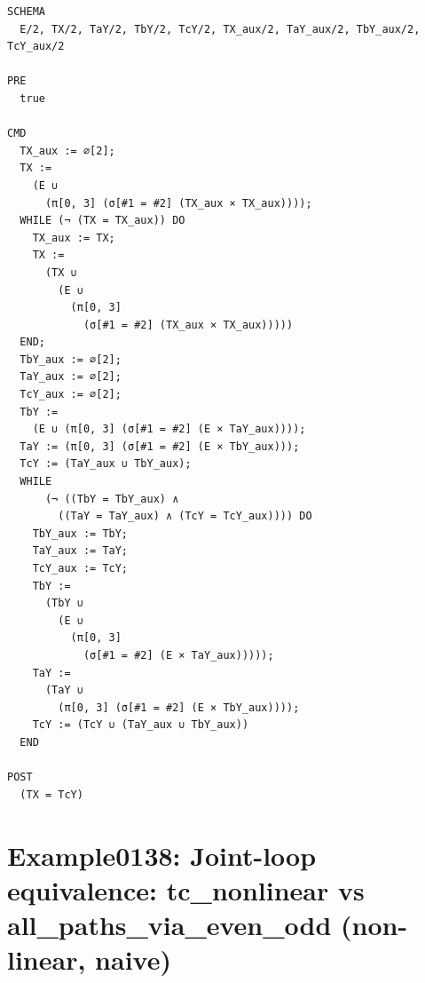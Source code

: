 \documentclass[10pt]{article}
\begin{document}
\begin{Verbatim}[fontsize=\tiny,breaklines=true,breakanywhere=true,frame=single,framesep=1.5mm]
SCHEMA
  E/2, TX/2, TaY/2, TbY/2, TcY/2, TX_aux/2, TaY_aux/2, TbY_aux/2, TcY_aux/2

PRE
  true 

CMD
  TX_aux := ∅[2];
  TX :=
    (E ∪
      (π[0, 3] (σ[#1 = #2] (TX_aux × TX_aux))));
  WHILE (¬ (TX = TX_aux)) DO
    TX_aux := TX;
    TX :=
      (TX ∪
        (E ∪
          (π[0, 3]
            (σ[#1 = #2] (TX_aux × TX_aux)))))
  END;
  TbY_aux := ∅[2];
  TaY_aux := ∅[2];
  TcY_aux := ∅[2];
  TbY :=
    (E ∪ (π[0, 3] (σ[#1 = #2] (E × TaY_aux))));
  TaY := (π[0, 3] (σ[#1 = #2] (E × TbY_aux)));
  TcY := (TaY_aux ∪ TbY_aux);
  WHILE
      (¬ ((TbY = TbY_aux) ∧
        ((TaY = TaY_aux) ∧ (TcY = TcY_aux)))) DO
    TbY_aux := TbY;
    TaY_aux := TaY;
    TcY_aux := TcY;
    TbY :=
      (TbY ∪
        (E ∪
          (π[0, 3]
            (σ[#1 = #2] (E × TaY_aux)))));
    TaY :=
      (TaY ∪
        (π[0, 3] (σ[#1 = #2] (E × TbY_aux))));
    TcY := (TcY ∪ (TaY_aux ∪ TbY_aux))
  END

POST
  (TX = TcY)
\end{Verbatim}

\Needspace{0.45\textheight}

\section{Example0138: Joint-loop equivalence: tc\_nonlinear vs all\_paths\_via\_even\_odd (non-linear, naive)}\label{case:Example0138}
\end{document}
